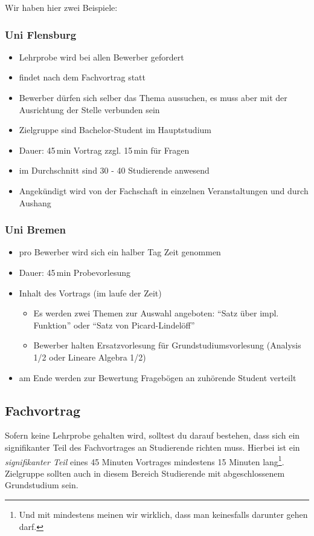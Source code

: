 Wir haben hier zwei Beispiele:

\subsubsection{Uni Flensburg}
\begin{itemize}
    \item Lehrprobe wird bei allen Bewerber gefordert
    \item findet nach dem Fachvortrag statt
    \item Bewerber dürfen sich selber das Thema aussuchen, es muss aber mit der Ausrichtung der Stelle verbunden sein
    \item Zielgruppe sind Bachelor-Student im Hauptstudium
    \item Dauer: 45\,min Vortrag zzgl. 15\,min für Fragen
    \item im Durchschnitt sind 30 - 40 Studierende anwesend
    \item Angekündigt wird von der Fachschaft in einzelnen Veranstaltungen und durch Aushang
\end{itemize}

\subsubsection{Uni Bremen}
\begin{itemize}
    \item pro Bewerber wird sich ein halber Tag Zeit genommen
    \item Dauer: 45\,min Probevorlesung
    \item Inhalt des Vortrags (im laufe der Zeit)
          \begin{itemize}
              \item Es werden zwei Themen zur Auswahl angeboten: "`Satz über impl. Funktion"' oder "`Satz von Picard-Lindelöff"'
              \item Bewerber halten Ersatzvorlesung für Grundstudiumsvorlesung (Analysis 1/2 oder Lineare Algebra 1/2)
          \end{itemize}
    \item am Ende werden zur Bewertung Fragebögen an zuhörende Student verteilt
\end{itemize}


\subsection{Fachvortrag}
Sofern keine Lehrprobe gehalten wird, solltest du darauf bestehen, dass sich ein signifikanter Teil des Fachvortrages an Studierende richten muss. Hierbei ist ein \emph{signifikanter Teil} eines 45 Minuten Vortrages mindestens 15 Minuten lang\footnote{Und mit mindestens meinen wir wirklich, dass man keinesfalls darunter gehen darf.}. Zielgruppe sollten auch in diesem Bereich Studierende mit abgeschlossenem Grundstudium sein.

